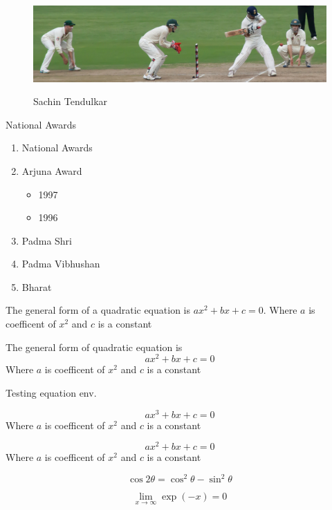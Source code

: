\documentclass{report}
\begin{document}
\begin{figure}
	\centering
	\includegraphics[scale=0.5]{Sachin-02}
	\label{sachinface}
	\caption{Sachin Tendulkar}
	
\end{figure}

National Awards
\begin{enumerate}
	\item National Awards
	\item Arjuna Award
		\begin{itemize}
			\item 1997
			\item 1996
		\end{itemize}
	\item Padma Shri
	\item Padma Vibhushan
	\item Bharat

\end{enumerate}

The general form of a quadratic equation is $ax^2+bx+c=0$. Where  $a$ is coefficent of $x^2$ and $c$ is a constant

The general form of quadratic equation is 
\begin{displaymath}
	ax^2+bx+c=0
\end{displaymath}
Where  $a$ is coefficent of $x^2$ and $c$ is a constant


Testing equation env.

\begin{equation}
	ax^3+bx+c=0
\end{equation}
Where  $a$ is coefficent of $x^2$ and $c$ is a constant


\begin{equation}
	ax^2+bx+c=0
\end{equation}
Where  $a$ is coefficent of $x^2$ and $c$ is a constant



\begin{equation}
	\cos 2\theta = \cos^2\theta - \sin^2\theta
\end{equation}

\begin{equation}
	\lim_{x \to \infty} \exp(-x) = 0
\end{equation}
\end{document}
